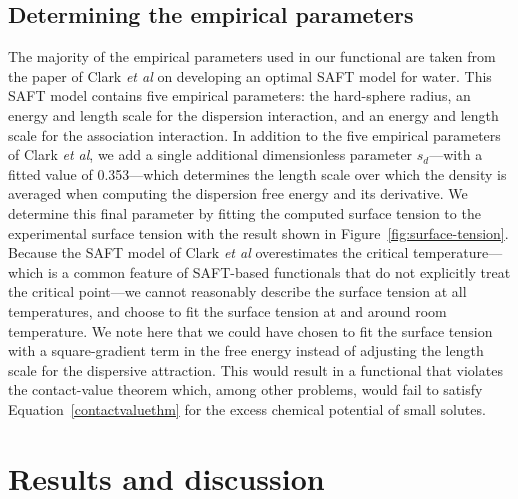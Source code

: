 \documentclass[twocolumn,amsmath,amssymb,prl]{revtex4-1}
\newcommand\lscale{\ensuremath{s_d}}
\begin{document}
\subsection{Determining the empirical parameters}\label{sec:empirical}


The majority of the empirical parameters used in our functional are
taken from the paper of Clark \emph{et al} on developing an optimal
SAFT model for water\cite{clark2006developing}.  This SAFT model
contains five empirical parameters: the hard-sphere radius, an energy
and length scale for the dispersion interaction, and an energy and
length scale for the association interaction.  In addition to the five
empirical parameters of Clark \emph{et al}, we add a single additional
dimensionless parameter $\lscale$---with a fitted value of
0.353---which determines the length scale over which the density is
averaged when computing the dispersion free energy and its derivative.
We determine this final parameter by fitting the computed surface
tension to the experimental surface tension with the result shown in
Figure~\ref{fig:surface-tension}.  Because the SAFT model of Clark
\emph{et al} overestimates the critical temperature---which is a
common feature of SAFT-based functionals that do not explicitly treat
the critical point---we cannot reasonably describe the surface tension
at all temperatures, and choose to fit the surface tension at and
around room temperature.  We note here that we could have chosen to
fit the surface tension with a square-gradient term in the free energy
instead of adjusting the length scale for the dispersive attraction.
This would result in a functional that violates the contact-value
theorem which, among other problems, would fail to satisfy
Equation~\ref{contactvaluethm} for the excess chemical potential of
small solutes.

\section{Results and discussion}
\end{document}
